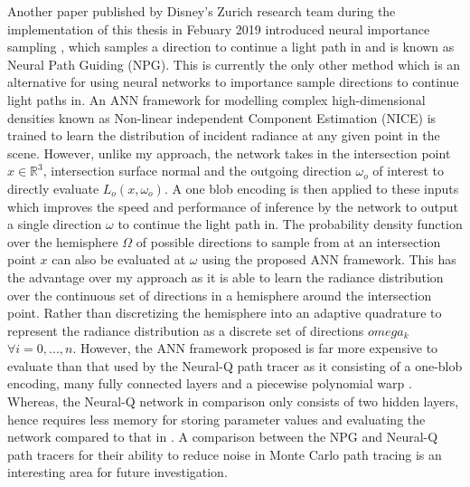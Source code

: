 \documentclass[../dissertation.tex]{subfiles}
\begin{document}
 Another paper published by Disney's Zurich research team during the implementation of this thesis in Febuary 2019 introduced neural importance sampling \cite{muller2018neural}, which samples a direction to continue a light path in and is known as Neural Path Guiding (NPG). This is currently the only other method which is an alternative for using neural networks to importance sample directions to continue light paths in. An ANN framework for modelling complex high-dimensional densities known as Non-linear independent Component Estimation (NICE) \cite{dinh2014nice} is trained to learn the distribution of incident radiance at any given point in the scene. However, unlike my approach, the network takes in the intersection point $x \in \mathbb{R}^3$, intersection surface normal and the outgoing direction $\omega_o$ of interest to directly evaluate $L_o(x, \omega_o)$. A one blob encoding is then applied to these inputs which improves the speed and performance of inference by the network to output a single direction $\omega$ to continue the light path in. The probability density function over the hemisphere $\Omega$ of possible directions to sample from at an intersection point $x$ can also be evaluated at $\omega$ using the proposed ANN framework. This has the advantage over my approach as it is able to learn the radiance distribution over the continuous set of directions in a hemisphere around the intersection point. Rather than discretizing the hemisphere into an adaptive quadrature to represent the radiance distribution as a discrete set of directions $omega_k$ $\forall i = 0, ..., n$. However, the ANN framework proposed is far more expensive to evaluate than that used by the Neural-Q path tracer as it consisting of a one-blob encoding, many fully connected layers and a piecewise polynomial warp \cite{muller2018neural}. Whereas, the Neural-Q network in comparison only consists of two hidden layers, hence requires less memory for storing parameter values and evaluating the network compared to that in \cite{muller2018neural}. A comparison between the NPG and Neural-Q path tracers for their ability to reduce noise in Monte Carlo path tracing is an interesting area for future investigation.
\end{document}
